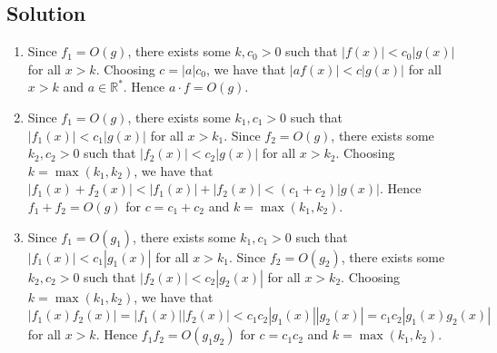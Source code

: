 \documentclass{article}
\begin{document}
\subsection*{Solution}
    \begin{enumerate}
        \item Since $f_{1} = O(g)$, there exists some $k, c_{0} > 0$ such that $|f(x)| < c_{0}|g(x)|$ for all $x > k$. Choosing $c = |a|c_{0}$, we have that $|af(x)| < c|g(x)|$ for all $x > k$ and $a \in \mathbb{R}^{*}$. Hence $a \cdot f = O(g)$.
        \item Since $f_{1} = O(g)$, there exists some $k_1, c_1 > 0$ such that $|f_{1}(x)| < c_{1}|g(x)|$ for all $x > k_{1}$. Since $f_{2} = O(g)$, there exists some $k_2, c_2 > 0$ such that $|f_{2}(x)| < c_{2}|g(x)|$ for all $x > k_{2}$. Choosing $k = \max(k_{1}, k_{2})$, we have that $|f_{1}(x) + f_{2}(x)| < |f_{1}(x)| + |f_{2}(x)| < (c_{1} + c_{2})|g(x)|$. Hence $f_{1} + f_{2} = O(g)$ for $c = c_{1} + c_{2}$ and $k = \max(k_{1}, k_{2})$.
        \item Since $f_{1} = O(g_{1})$, there exists some $k_1, c_1 > 0$ such that $|f_{1}(x)| < c_{1}|g_{1}(x)|$ for all $x > k_{1}$. Since $f_{2} = O(g_{2})$, there exists some $k_{2}, c_{2} > 0$ such that $|f_{2}(x)| < c_{2}|g_{2}(x)|$ for all $x > k_{2}$. Choosing $k = \max(k_{1}, k_{2})$, we have that $|f_{1}(x)f_{2}(x)| = |f_{1}(x)||f_{2}(x)| < c_{1}c_{2}|g_{1}(x)||g_{2}(x)| = c_{1}c_{2}|g_{1}(x)g_{2}(x)|$ for all $x > k$. Hence $f_{1}f_{2} = O(g_{1}g_{2})$ for $c = c_{1}c_{2}$ and $k = \max(k_{1}, k_{2})$.
    \end{enumerate}
\end{document}
